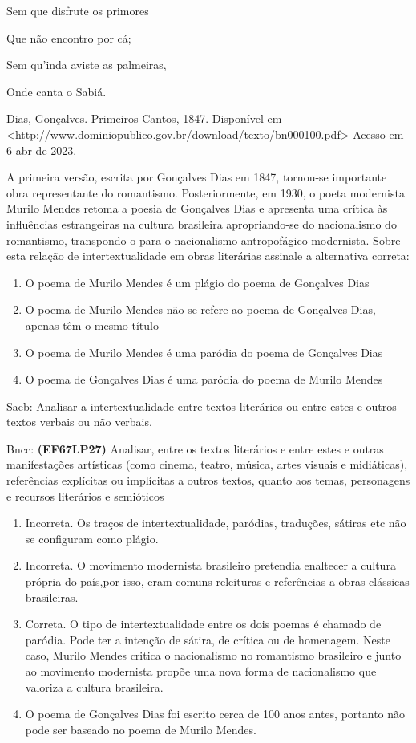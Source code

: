 {Sem que disfrute os primores

Que não encontro por cá;

Sem qu'inda aviste as palmeiras,

Onde canta o Sabiá.

Dias, Gonçalves. Primeiros Cantos, 1847. Disponível em
\textless{}\href{http://www.dominiopublico.gov.br/download/texto/bn000100.pdf}{\uline{http://www.dominiopublico.gov.br/download/texto/bn000100.pdf}}\textgreater{}
Acesso em 6 abr de 2023.

A primeira versão, escrita por Gonçalves Dias em 1847, tornou-se
importante obra representante do romantismo. Posteriormente, em 1930, o
poeta modernista Murilo Mendes retoma a poesia de Gonçalves Dias e
apresenta uma crítica às influências estrangeiras na cultura brasileira
apropriando-se do nacionalismo do romantismo, transpondo-o para o
nacionalismo antropofágico modernista. Sobre esta relação de
intertextualidade em obras literárias assinale a alternativa correta:

\begin{enumerate}
\def\labelenumi{\alph{enumi})}
\item
  O poema de Murilo Mendes é um plágio do poema de Gonçalves Dias
\item
  O poema de Murilo Mendes não se refere ao poema de Gonçalves Dias,
  apenas têm o mesmo título
\item
  O poema de Murilo Mendes é uma paródia do poema de Gonçalves Dias
\item
  O poema de Gonçalves Dias é uma paródia do poema de Murilo Mendes
\end{enumerate}

Saeb: Analisar a intertextualidade entre textos literários ou entre
estes e outros textos verbais ou não verbais.

Bncc: \textbf{(EF67LP27)} Analisar, entre os textos literários e entre
estes e outras manifestações artísticas (como cinema, teatro, música,
artes visuais e midiáticas), referências explícitas ou implícitas a
outros textos, quanto aos temas, personagens e recursos literários e
semióticos

\begin{enumerate}
\def\labelenumi{\arabic{enumi}.}
\item
  Incorreta. Os traços de intertextualidade, paródias, traduções,
  sátiras etc não se configuram como plágio.
\item
  Incorreta. O movimento modernista brasileiro pretendia enaltecer a
  cultura própria do país,por isso, eram comuns releituras e referências
  a obras clássicas brasileiras.
\item
  Correta. O tipo de intertextualidade entre os dois poemas é chamado de
  paródia. Pode ter a intenção de sátira, de crítica ou de homenagem.
  Neste caso, Murilo Mendes critica o nacionalismo no romantismo
  brasileiro e junto ao movimento modernista propõe uma nova forma de
  nacionalismo que valoriza a cultura brasileira.
\item
  O poema de Gonçalves Dias foi escrito cerca de 100 anos antes,
  portanto não pode ser baseado no poema de Murilo Mendes.
\end{enumerate}

}
